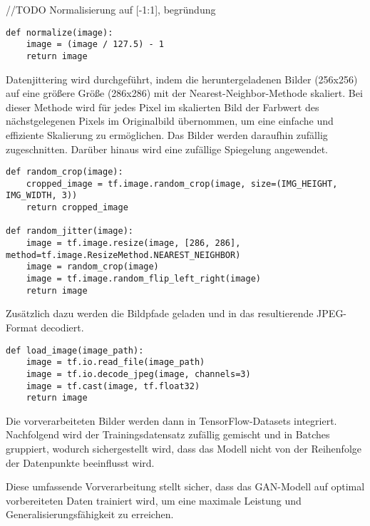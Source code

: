 //TODO Normalisierung auf [-1:1], begründung

\newpage
\begin{lstlisting}[language=pyhaff, caption={Vorverarbeitung des Datensatzes: Normalisierung}, label={cod:normalizing}]
def normalize(image):
    image = (image / 127.5) - 1
    return image
\end{lstlisting}

Datenjittering wird durchgeführt, indem die heruntergeladenen Bilder (256x256) auf eine größere Größe (286x286) mit der Nearest-Neighbor-Methode skaliert. Bei dieser Methode wird für jedes Pixel im skalierten Bild der Farbwert des nächstgelegenen Pixels im Originalbild übernommen, um eine einfache und effiziente Skalierung zu ermöglichen. Das Bilder werden daraufhin zufällig zugeschnitten. Darüber hinaus wird eine zufällige Spiegelung angewendet.

\begin{lstlisting}[language=pyhaff, caption={Vorverarbeitung des Datensatzes: Jittering}, label={cod:jittering}]
def random_crop(image):
    cropped_image = tf.image.random_crop(image, size=(IMG_HEIGHT, IMG_WIDTH, 3))
    return cropped_image

def random_jitter(image):
    image = tf.image.resize(image, [286, 286], method=tf.image.ResizeMethod.NEAREST_NEIGHBOR)
    image = random_crop(image)
    image = tf.image.random_flip_left_right(image)
    return image
\end{lstlisting}

Zusätzlich dazu werden die Bildpfade geladen und in das resultierende JPEG-Format decodiert.

\begin{lstlisting}[language=pyhaff, caption={Lesen eines Bildes}, label={cod:imageLoading}]
def load_image(image_path):
    image = tf.io.read_file(image_path)
    image = tf.io.decode_jpeg(image, channels=3)
    image = tf.cast(image, tf.float32)
    return image
\end{lstlisting}

Die vorverarbeiteten Bilder werden dann in TensorFlow-Datasets integriert. Nachfolgend wird der Trainingsdatensatz zufällig gemischt und in Batches gruppiert, wodurch sichergestellt wird, dass das Modell nicht von der Reihenfolge der Datenpunkte beeinflusst wird.
\newpage 


Diese umfassende Vorverarbeitung stellt sicher, dass das GAN-Modell auf optimal vorbereiteten Daten trainiert wird, um eine maximale Leistung und Generalisierungsfähigkeit zu erreichen.


